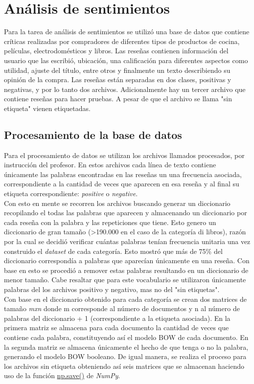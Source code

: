 \section{Análisis de sentimientos}
Para la tarea de análisis de sentimientos se utilizó una base de datos que contiene críticas realizadas por compradores de diferentes tipos de productos de cocina, películas, electrodomésticos y libros. Las reseñas contienen información del usuario que las escribió, ubicación, una calificación para diferentes aspectos como utilidad, ajuste del título, entre otros y finalmente un texto describiendo su opinión de la compra. Las reseñas están separadas en dos clases, positivas y negativas, y por lo tanto dos archivos. Adicionalmente hay un tercer archivo que contiene reseñas para hacer pruebas. A pesar de que el archivo se llama "sin etiqueta" vienen etiquetadas.
\subsection{Procesamiento de la base de datos}
Para el procesamiento de datos se utilizan los archivos llamados procesados, por instrucción del profesor. En estos archivos cada línea de texto contiene únicamente las palabras encontradas en las reseñas un una frecuencia asociada, correspondiente a la cantidad de veces que aparecen en esa reseña y al final su etiqueta correspondiente: \textit{positive} o \textit{negative}.\\

Con esto en mente se recorren los archivos buscando generar un diccionario recopilando el todas las palabras que aparecen y almacenando un diccionario por cada reseña con la palabra y las repeticiones que tiene. Esto genero un diccionario de gran tamaño (>190.000 en el caso de la categoría di libros), razón por la cual se decidió verificar cuántas palabras tenían frecuencia unitaria una vez construido el \textit{dataset} de cada categoría. Esto mostró que más de 75\% del diccionario correspondía a palabras que aparecían únicamente en una reseña. Con base en esto se procedió a remover estas palabras resultando en un diccionario de menor tamaño. Cabe resaltar que para este vocabulario se utilizaron únicamente palabras del los archivos positivo y negativo, mas no del "sin etiquetas".\\

Con base en el diccionario obtenido para cada categoría se crean dos matrices de tamaño \textit{mxn} donde m corresponde al número de documentos y n al número de palabras del diccionario + 1 (correspondiente a la etiqueta asociada). En la primera matriz se almacena para cada documento la cantidad de veces que contiene cada palabra, constituyendo así el modelo BOW de cada documento. En la segunda matriz se almacena únicamente el hecho de que tenga o no la palabra, generando el modelo BOW booleano. De igual manera, se realiza el proceso para los archivos sin etiqueta obteniendo así seis matrices que se almacenan haciendo uso de la función \url{np.save()} de \textit{NumPy}.\\

